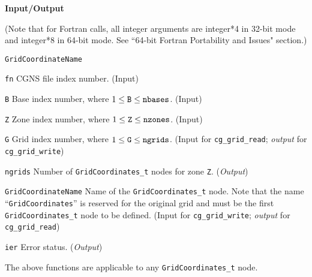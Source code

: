 \noindent
\textbf{\textcolor{input}{Input}/\textcolor{output}{Output}}

\noindent (Note that for Fortran calls, all integer arguments are integer*4 in 32-bit mode and integer*8 in 64-bit mode.
See ``64-bit Fortran Portability and Issues" section.)

\begin{Ventryi}{\texttt{GridCoordinateName}}\raggedright
\item [\texttt{fn}]
      CGNS file index number.
      (\textcolor{input}{Input})
\item [\texttt{B}]
      Base index number, where $1 \leq \text{\texttt{B}} \leq \text{\texttt{nbases}}$.
      (\textcolor{input}{Input})
\item [\texttt{Z}]
      Zone index number, where $1 \leq \text{\texttt{Z}} \leq \text{\texttt{nzones}}$.
      (\textcolor{input}{Input})
\item [\texttt{G}]
      Grid index number, where $1 \leq \text{\texttt{G}} \leq \text{\texttt{ngrids}}$.
      (\textcolor{input}{Input} for \texttt{cg\_grid\_read};
      \textcolor{output}{\textit{output}} for \texttt{cg\_grid\_write})
\item [\texttt{ngrids}]
      Number of \texttt{GridCoordinates\_t} nodes for zone \texttt{Z}.
      (\textcolor{output}{\textit{Output}})
\item [\texttt{GridCoordinateName}]
      Name of the \texttt{GridCoordinates\_t} node.
      Note that the name ``\texttt{GridCoordinates}'' is reserved for the
      original grid and must be the first \texttt{GridCoordinates\_t}
      node to be defined.
      (\textcolor{input}{Input} for \texttt{cg\_grid\_write};
      \textcolor{output}{\textit{output}} for \texttt{cg\_grid\_read})
\item [\texttt{ier}]
      Error status.
      (\textcolor{output}{\textit{Output}})
\end{Ventryi}

The above functions are applicable to any \texttt{GridCoordinates\_t} node.

